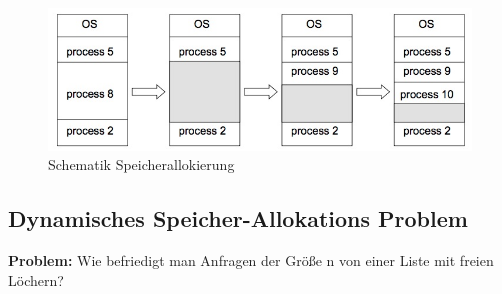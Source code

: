\documentclass[a4paper]{scrreprt}
\begin{document}
\begin{figure}[ht]
\centering
\includegraphics[scale=0.6]{graphics/allocation.png}
\caption{Schematik Speicherallokierung}
\end{figure}
\newpage
\subsection{Dynamisches Speicher-Allokations Problem}
\textbf{Problem:} Wie befriedigt man Anfragen der Größe n von einer Liste mit freien Löchern?
\end{document}
